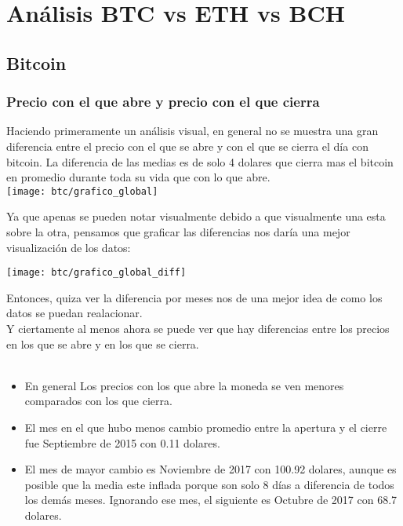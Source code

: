 \documentclass[12pt,letterpaper]{article}
\begin{document}
\section*{An\'alisis BTC vs ETH vs BCH}

    \subsection*{Bitcoin}

    \subsubsection*{Precio con el que abre y precio con el que cierra}

    Haciendo primeramente un an\'alisis visual, en general no se muestra una gran diferencia entre el precio con el que se abre y con el que se cierra el día con bitcoin. La diferencia de las medias es de solo 4 dolares que cierra mas el bitcoin en promedio durante toda su vida que con lo que abre.
    \\
    
    \texttt{[image: btc/grafico\_global]}

    Ya que apenas se pueden notar visualmente debido a que visualmente una esta sobre la otra, pensamos que graficar las diferencias nos dar\'ia una mejor visualizaci\'on de los datos:

    \texttt{[image: btc/grafico\_global\_diff]}

    
    Entonces, quiza ver la diferencia por meses nos de una mejor idea de como los datos se puedan realacionar.
    \\

    Y ciertamente al menos ahora se puede ver que hay diferencias entre los precios en los que se abre y en los que se cierra.
    \\

    \\
    \begin{itemize}

        \item En general Los precios con los que abre la moneda se ven menores comparados con los que cierra.

        \item El mes en el que hubo menos cambio promedio entre la apertura y el cierre fue Septiembre de 2015 con 0.11 dolares.

        \item El mes de mayor cambio es Noviembre de 2017 con 100.92 dolares, aunque es posible que la media este inflada porque son solo 8 días a diferencia de todos los demás meses. Ignorando ese mes, el siguiente es Octubre de 2017 con 68.7 dolares.

    \end{itemize}
\end{document}

